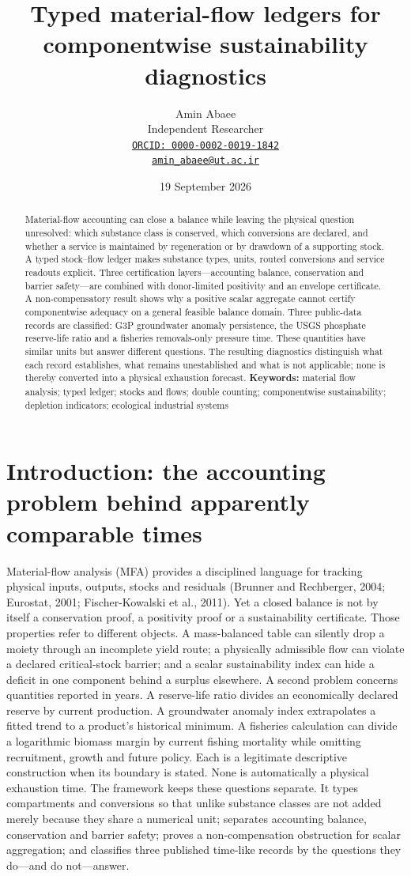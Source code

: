 \documentclass[11pt]{article}
\title{Typed material-flow ledgers for componentwise sustainability diagnostics}
\author{Amin Abaee\\[0.25em]
{\small Independent Researcher}\\[0.25em]
{\small\href{https://orcid.org/0000-0002-0019-1842}{\nolinkurl{ORCID: 0000-0002-0019-1842}}}\\[0.25em]
{\small\href{mailto:amin_abaee@ut.ac.ir}{\nolinkurl{amin_abaee@ut.ac.ir}}}}
\date{19 September 2026}
\begin{document}
\maketitle
\begin{abstract}
Material-flow accounting can close a balance while leaving the physical question unresolved: which substance class is conserved, which conversions are declared, and whether a service is maintained by regeneration or by drawdown of a supporting stock. A typed stock--flow ledger makes substance types, units, routed conversions and service readouts explicit. Three certification layers---accounting balance, conservation and barrier safety---are combined with donor-limited positivity and an envelope certificate. A non-compensatory result shows why a positive scalar aggregate cannot certify componentwise adequacy on a general feasible balance domain. Three public-data records are classified: G3P groundwater anomaly persistence, the USGS phosphate reserve-life ratio and a fisheries removals-only pressure time. These quantities have similar units but answer different questions. The resulting diagnostics distinguish what each record establishes, what remains unestablished and what is not applicable; none is thereby converted into a physical exhaustion forecast.
\textbf{Keywords:} material flow analysis; typed ledger; stocks and flows; double counting; componentwise sustainability; depletion indicators; ecological industrial systems
\end{abstract}
\section{Introduction: the accounting problem behind apparently comparable times}
Material-flow analysis (MFA) provides a disciplined language for tracking physical inputs, outputs, stocks and residuals (Brunner and Rechberger, 2004; Eurostat, 2001; Fischer-Kowalski et al., 2011). Yet a closed balance is not by itself a conservation proof, a positivity proof or a sustainability certificate. Those properties refer to different objects. A mass-balanced table can silently drop a moiety through an incomplete yield route; a physically admissible flow can violate a declared critical-stock barrier; and a scalar sustainability index can hide a deficit in one component behind a surplus elsewhere.
A second problem concerns quantities reported in years. A reserve-life ratio divides an economically declared reserve by current production. A groundwater anomaly index extrapolates a fitted trend to a product's historical minimum. A fisheries calculation can divide a logarithmic biomass margin by current fishing mortality while omitting recruitment, growth and future policy. Each is a legitimate descriptive construction when its boundary is stated. None is automatically a physical exhaustion time.
The framework keeps these questions separate. It types compartments and conversions so that unlike substance classes are not added merely because they share a numerical unit; separates accounting balance, conservation and barrier safety; proves a non-compensation obstruction for scalar aggregation; and classifies three published time-like records by the questions they do---and do not---answer.
\end{document}
